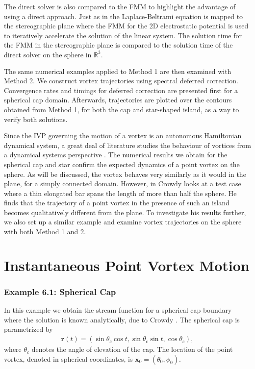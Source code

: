 \documentclass{sfuthesis}
\begin{document}
The direct solver is also compared to the FMM to highlight the advantage of using a direct approach. Just as in \cite{KropNig2014} the Laplace-Beltrami equation is mapped to the stereographic plane where the FMM for the 2D electrostatic potential is used to iteratively accelerate the solution of the linear system. The solution time for the FMM in the stereographic plane is compared to the solution time of the direct solver on the sphere in $\mathbb{R}^3$. 

The same numerical examples applied to Method 1 are then examined with Method 2. We construct vortex trajectories using spectral deferred correction. Convergence rates and timings for deferred correction are presented first for a spherical cap domain. Afterwards, trajectories are plotted over the contours obtained from Method 1, for both the cap and star-shaped island, as a way to verify both solutions. 

Since the IVP governing the motion of a vortex is an autonomous Hamiltonian dynamical system, a great deal of literature studies the behaviour of vortices from a dynamical systems perspective \cite{Crowdy2006, Newt2001, Kid2000Stream, Drit15}. The numerical results we obtain for the spherical cap and star confirm the expected dynamics of a point vortex on the sphere. As will be discussed, the vortex behaves very similarly as it would in the plane, for a simply connected domain. 
However, in \cite{Crowdy2006} Crowdy looks at a test case where a thin elongated bar spans the length of more than half the sphere. He finds that the trajectory of a point vortex in the presence of such an island becomes qualitatively different from the plane. To investigate his results further, we also set up a similar example and examine vortex trajectories on the sphere with both Method 1 and 2. 

\section{Instantaneous Point Vortex Motion}
\subsubsection{Example 6.1: Spherical Cap}
In this example we obtain the stream function for a spherical cap boundary where the solution is known analytically, due to Crowdy \cite{Crowdy2006}. 
The spherical cap is parametrized by 
\begin{align*}
	\mathbf{r}(t)=(\sin \theta_c \cos t, \sin \theta_c \sin t, \cos \theta_c),
\end{align*}
where $\theta_c$ denotes the angle of elevation of the cap. The location of the point vortex, denoted in spherical coordinates, is $\mathbf{x}_0=(\theta_0, \phi_0)$. 
\end{document}
